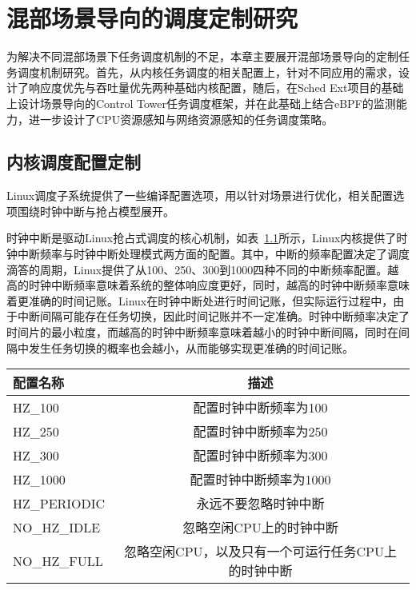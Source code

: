 \chapter{混部场景导向的调度定制研究}\label{chap:sched_policy}


为解决不同混部场景下任务调度机制的不足，本章主要展开混部场景导向的定制任务调度机制研究。首先，从内核任务调度的相关配置上，针对不同应用的需求，设计了响应度优先与吞吐量优先两种基础内核配置，随后，在Sched Ext项目的基础上设计场景导向的Control Tower任务调度框架，并在此基础上结合eBPF的监测能力，进一步设计了CPU资源感知与网络资源感知的任务调度策略。

\section{内核调度配置定制}

Linux调度子系统提供了一些编译配置选项，用以针对场景进行优化，相关配置选项围绕时钟中断与抢占模型展开。

时钟中断是驱动Linux抢占式调度的核心机制，如表~\ref{tab:config_hz}所示，Linux内核提供了时钟中断频率与时钟中断处理模式两方面的配置。其中，中断的频率配置决定了调度滴答的周期，Linux提供了从100、250、300到1000四种不同的中断频率配置。越高的时钟中断频率意味着系统的整体响应度更好，同时，越高的时钟中断频率意味着更准确的时间记账。Linux在时钟中断处进行时间记账，但实际运行过程中，由于中断间隔可能存在任务切换，因此时间记账并不一定准确。时钟中断频率决定了时间片的最小粒度，而越高的时钟中断频率意味着越小的时钟中断间隔，同时在间隔中发生任务切换的概率也会越小，从而能够实现更准确的时间记账。

\begin{table}[H]
    \label{tab:config_hz}
    \footnotesize%
    \setlength{\tabcolsep}{4pt}%
    \renewcommand{\arraystretch}{1.25}%
    \centering
    \begin{tabular}{lc}
        \hline
        配置名称 & 描述 \\
        \hline
        HZ\_100  & 配置时钟中断频率为100  \\
        HZ\_250  & 配置时钟中断频率为250 \\
        HZ\_300  & 配置时钟中断频率为300 \\
        HZ\_1000 & 配置时钟中断频率为1000 \\
        HZ\_PERIODIC & 永远不要忽略时钟中断 \\
        NO\_HZ\_IDLE & 忽略空闲CPU上的时钟中断 \\
        NO\_HZ\_FULL & 忽略空闲CPU，以及只有一个可运行任务CPU上的时钟中断 \\
        \hline
    \end{tabular}
\end{table}

